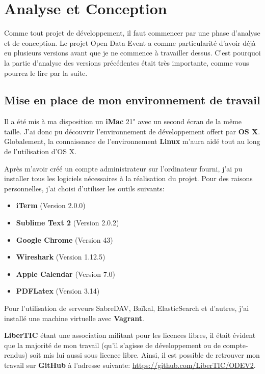 \section{Analyse et Conception}

Comme tout projet de développement, il faut commencer par une phase d'analyse et de conception. Le projet Open Data Event a comme particularité d'avoir déjà eu plusieurs versions avant que je ne commence à travailler dessus. C'est pourquoi la partie d'analyse des versions précédentes était très importante, comme vous pourrez le lire par la suite.

\subsection{Mise en place de mon environnement de travail}

Il a été mis à ma disposition un \textbf{iMac} 21" avec un second écran de la même taille. J'ai donc pu découvrir l'environnement de développement offert par \textbf{OS X}. Globalement, la connaissance de l'environnement \textbf{Linux} m'aura aidé tout au long de l'utilisation d'OS X.

Après m'avoir créé un compte administrateur sur l'ordinateur fourni, j'ai pu installer tous les logiciels nécessaires à la réalisation du projet. Pour des raisons personnelles, j'ai choisi d'utiliser les outils suivants:

\begin{itemize}
    \item \textbf{iTerm} (Version 2.0.0)
    \item \textbf{Sublime Text 2} (Version 2.0.2)
    \item \textbf{Google Chrome} (Version 43)
    \item \textbf{Wireshark} (Version 1.12.5)
    \item \textbf{Apple Calendar} (Version 7.0)
    \item \textbf{PDFLatex} (Version 3.14)
\end{itemize}

Pour l'utilisation de serveurs SabreDAV, Baïkal, ElasticSearch et d'autres, j'ai installé une machine virtuelle avec \textbf{Vagrant}.

\textbf{LiberTIC} étant une association militant pour les licences libres, il était évident que la majorité de mon travail (qu'il s'agisse de développement ou de compte-rendus) soit mis lui aussi sous licence libre. Ainsi, il est possible de retrouver mon travail sur \textbf{GitHub} à l'adresse suivante: \url{https://github.com/LiberTIC/ODEV2}.

